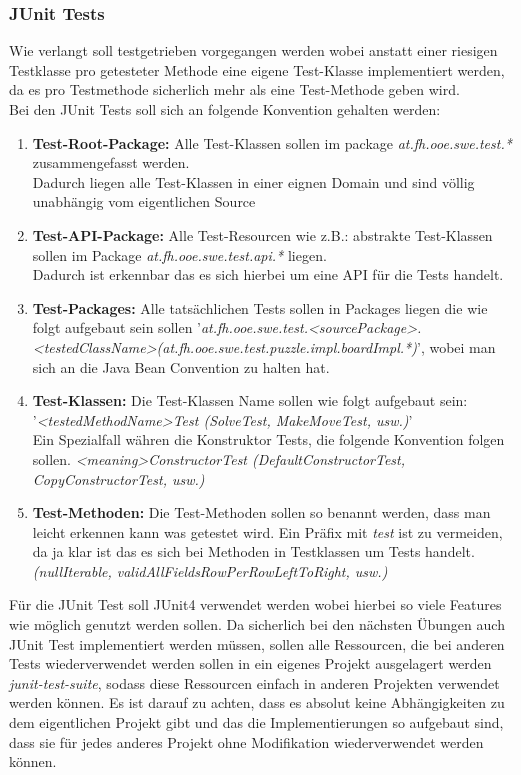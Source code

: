 \documentclass[11pt, a4paper, twoside]{article}   	%
\newcommand{\mainTestPackage}{at.fh.ooe.swe.test}
\begin{document}
\subsubsection{JUnit Tests}
Wie verlangt soll testgetrieben vorgegangen werden wobei anstatt einer riesigen Testklasse pro getesteter Methode eine eigene Test-Klasse implementiert werden, da es pro Testmethode sicherlich mehr als eine Test-Methode geben wird. \\
Bei den JUnit Tests soll sich an folgende Konvention gehalten werden: \\
\begin{enumerate}
	\item \textbf{Test-Root-Package:} Alle Test-Klassen sollen im package \emph{\mainTestPackage.*} zusammengefasst werden. \\
	Dadurch liegen alle Test-Klassen in einer eignen Domain und sind völlig unabhängig vom eigentlichen Source
	\item \textbf{Test-API-Package:} Alle Test-Resourcen wie z.B.: abstrakte Test-Klassen sollen im Package \emph{\mainTestPackage.api.*} liegen. \\
	Dadurch ist erkennbar das es sich hierbei um eine API für die Tests handelt.
	\item \textbf{Test-Packages:} Alle tatsächlichen Tests sollen in Packages liegen die wie folgt aufgebaut sein sollen '\emph{\mainTestPackage.\textless sourcePackage\textgreater .\textless testedClassName\textgreater (\mainTestPackage.puzzle.impl.boardImpl.*)}', wobei man sich an die Java Bean Convention zu halten hat.
	\item \textbf{Test-Klassen:} Die Test-Klassen Name sollen wie folgt aufgebaut sein: '\emph{\textless testedMethodName\textgreater Test (SolveTest, MakeMoveTest, usw.)}' \\
	Ein Spezialfall währen die Konstruktor Tests, die folgende Konvention folgen sollen. \emph{\textless meaning\textgreater ConstructorTest (DefaultConstructorTest, CopyConstructorTest, usw.)}
	\item \textbf{Test-Methoden:} Die Test-Methoden sollen so benannt werden, dass man leicht erkennen kann was getestet wird. Ein Präfix mit \emph{test} ist zu vermeiden, da ja klar ist das es sich bei Methoden in Testklassen um Tests handelt. \emph{(nullIterable, validAllFieldsRowPerRowLeftToRight, usw.)}
\end{enumerate}
Für die JUnit Test soll JUnit4 verwendet werden wobei hierbei so viele Features wie möglich genutzt werden sollen. Da sicherlich bei den nächsten Übungen auch JUnit Test implementiert werden müssen, sollen alle Ressourcen, die bei anderen Tests wiederverwendet werden sollen in ein eigenes Projekt ausgelagert werden \emph{junit-test-suite}, sodass diese Ressourcen einfach in anderen Projekten verwendet werden können. Es ist darauf zu achten, dass es absolut keine Abhängigkeiten zu dem eigentlichen Projekt gibt und das die Implementierungen so aufgebaut sind, dass sie für jedes anderes Projekt ohne Modifikation wiederverwendet werden können. \\\\
\end{document}
